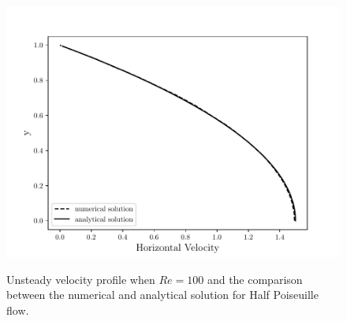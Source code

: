 \begin{figure}[H]
     \caption{
Unsteady velocity profile when $Re=100$ and the comparison between
the numerical and analytical solution for Half Poiseuille flow.} 
     \centering
     \includegraphics[scale=1]{./02_chaps/cap_validation/figure/half_poiseuille_velocity.pdf}\\
     \medskip
     \label{velocidade half poiseuille}
\end{figure}

